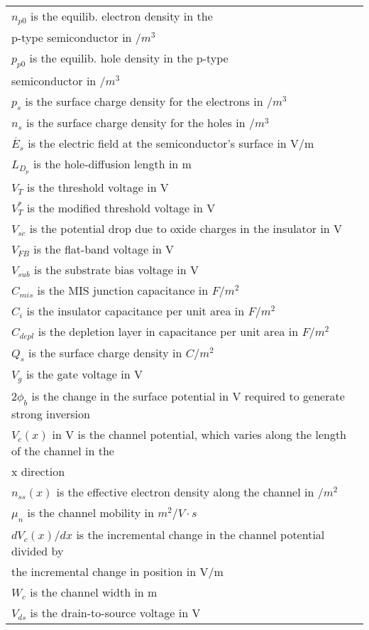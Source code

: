 \documentclass[10pt,landscape]{article}
\begin{document}
\begin{multicols}{3}
\begin{tabular}{@{}ll@{}}
$ n_{p0}$ is the equilib. electron density in the \\
p-type semiconductor in $/m^3$ \\
$ p_{p0}$ is the equilib. hole density in the p-type \\
semiconductor in $/m^3$ \\
$ p_s$ is the surface charge density for the electrons in $/m^3$ \\
$ n_s$ is the surface charge density for the holes in $/m^3$ \\
$ \acute{E_s}$ is the electric field at the semiconductor's surface in V/m \\
$ L_{D_p}$ is the hole-diffusion length in m \\
$ V_T$ is the threshold voltage in V \\
$ V^*_T$ is the modified threshold voltage in V \\
$ V_{sc}$ is the potential drop due to oxide charges in the insulator in V \\
$ V_{FB}$ is the flat-band voltage in V \\
$ V_{sub}$ is the substrate bias voltage in V \\
$ C_{mis}$ is the MIS junction capacitance in $F/m^2$ \\
$ C_i$ is the insulator capacitance per unit area in $F/m^2$ \\
$ C_{depl}$ is the depletion layer in capacitance per unit area in $F/m^2$ \\
$ Q_s$ is the surface charge density in $C/m^2$ \\
$ V_g$ is the gate voltage in V \\
$ 2\phi_b$ is the change in the surface potential in V required to generate strong inversion \\
$ V_c(x)$ in V is the channel potential, which varies along the length of the channel in the \\
x direction \\
$ n_{ss}(x)$ is the effective electron density along the channel in $/m^2$ \\
$ \mu_n$ is the channel mobility in $m^2/V\cdot s$ \\
$ dV_c(x)/dx$ is the incremental change in the channel potential divided by \\
the incremental change in position in V/m \\
$ W_c$ is the channel width in m \\
$ V_{ds}$ is the drain-to-source voltage in V \\

\end{tabular}
\end{multicols}
\end{document}
